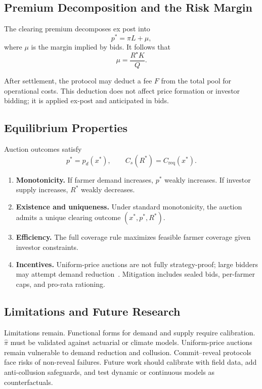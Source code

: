 \documentclass[11pt,a4paper]{article}
\begin{document}
        \subsection{Premium Decomposition and the Risk Margin}\label{subsec:premium-decomposition}
        The clearing premium decomposes ex post into
        \[
            p^\ast = \hat{\pi}L + \mu,
        \]
        where $\mu$ is the margin implied by bids.
        It follows that
        \[
            \mu = \frac{R^\star K}{Q}.
        \]

        After settlement, the protocol may deduct a fee $F$ from the total pool for operational costs.
        This deduction does not affect price formation or investor bidding; it is applied ex-post and anticipated in bids.

        \subsection{Equilibrium Properties}\label{subsec:equilibrium-properties}
        Auction outcomes satisfy
        \[
            p^\ast = p_d(x^\ast), \qquad C_s(R^\ast) = C_{\mathrm{req}}(x^\ast).
        \]

        \begin{enumerate}[]
            \item \textbf{Monotonicity.} If farmer demand increases, $p^\ast$ weakly increases. If investor supply increases, $R^\ast$ weakly decreases.
            \item \textbf{Existence and uniqueness.} Under standard monotonicity, the auction admits a unique clearing outcome $(x^\ast,p^\ast,R^\ast)$.
            \item \textbf{Efficiency.} The full coverage rule maximizes feasible farmer coverage given investor constraints.
            \item \textbf{Incentives.} Uniform-price auctions are not fully strategy-proof; large bidders may attempt demand reduction~\parencite{ausubel2002demand}. Mitigation includes sealed bids, per-farmer caps, and pro-rata rationing.
        \end{enumerate}

            \subsection{Limitations and Future Research}\label{subsec:limitations-and-future-research}
        Limitations remain. Functional forms for demand and supply require calibration. $\hat{\pi}$ must be validated against actuarial or climate models.
        Uniform-price auctions remain vulnerable to demand reduction and collusion.
        Commit--reveal protocols face risks of non-reveal failures.
        Future work should calibrate with field data, add anti-collusion safeguards, and test dynamic or continuous models as counterfactuals.
\end{document}
